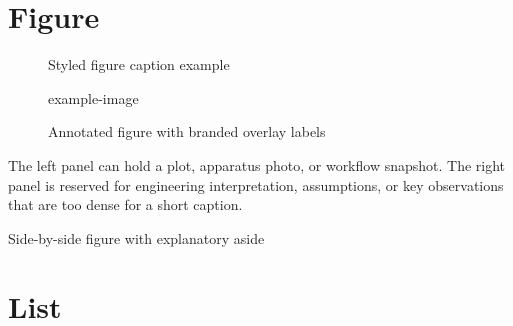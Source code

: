 \documentclass[titlepage=formal,logo=assets/校徽+中英文校名-上下.pdf,code=listings]{SUSTechHomework}
\begin{document}
\section{Figure}\label{sec:figure}

\begin{figure}[htbp]
  \centering
  \fbox{\rule{0pt}{3cm}\rule{0.72\linewidth}{0pt}}
  \caption{Styled figure caption example}
  \label{fig:styled-caption}
\end{figure}

\begin{sustechfiguregroup}
  \begin{sustechsubfigure}
    \sustechplaceholdergraphic[0.92\linewidth][3cm]
  \end{sustechsubfigure}
  \sustechfloatsep
  \begin{sustechsubfigure}
    \sustechplaceholdergraphic[0.92\linewidth][3cm]
  \end{sustechsubfigure}
  \caption{Two subfigures in one grouped figure}
\end{sustechfiguregroup}

\begin{sustechwidefigure}
  \sustechplaceholdergraphic[0.9\textwidth][2.8cm]
  \caption{Wide figure placeholder for future two-column layouts}
\end{sustechwidefigure}

\begin{figure}[htbp]
  \centering
  \begin{sustechoverpic}[0.72\linewidth]{example-image}
  \end{sustechoverpic}
  \caption{Annotated figure with branded overlay labels}
\end{figure}

\sustechfigurewithaside
  {\sustechplaceholdergraphic[0.95\linewidth][4cm]}
  {
    \begin{sustechaside}
    \small
    The left panel can hold a plot, apparatus photo, or workflow snapshot.
    The right panel is reserved for engineering interpretation, assumptions,
    or key observations that are too dense for a short caption.
    \end{sustechaside}
  }
  {Side-by-side figure with explanatory aside}

\section{List}
\end{document}
